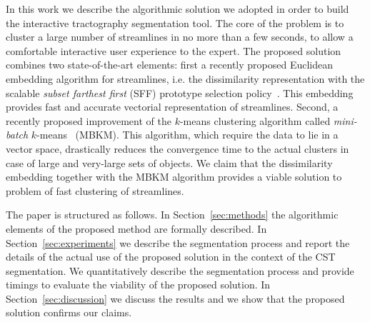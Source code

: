 In this work we describe the algorithmic solution we adopted in order
to build the interactive tractography segmentation tool. The core of
the problem is to cluster a large number of streamlines in no more
than a few seconds, to allow a comfortable interactive user experience
to the expert. The proposed solution combines two state-of-the-art
elements: first a recently proposed Euclidean embedding algorithm for
streamlines, i.e. the dissimilarity representation with the scalable
\emph{subset farthest first} (SFF) prototype selection
policy~\cite{olivetti2012approximation}. This embedding provides fast
and accurate vectorial representation of streamlines. Second, a
recently proposed improvement of the $k$-means clustering algorithm
called \emph{mini-batch} $k$-means~\cite{sculley2010web} (MBKM). This
algorithm, which require the data to lie in a vector space,
drastically reduces the convergence time to the actual clusters in
case of large and very-large sets of objects. We claim that the
dissimilarity embedding together with the MBKM algorithm provides a
viable solution to problem of fast clustering of streamlines.

The paper is structured as follows. In Section~\ref{sec:methods} the
algorithmic elements of the proposed method are formally described. In
Section~\ref{sec:experiments} we describe the segmentation process and
report the details of the actual use of the proposed solution in the
context of the CST segmentation. We quantitatively describe the
segmentation process and provide timings to evaluate the viability of
the proposed solution. In Section~\ref{sec:discussion} we discuss the
results and we show that the proposed solution confirms our claims. 

